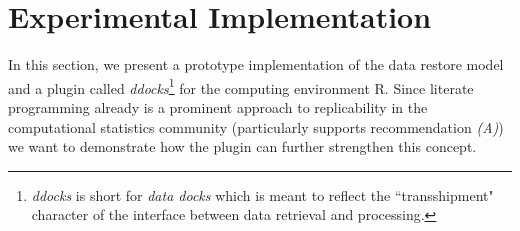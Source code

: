 \documentclass{acm_proc_article-sp}
\begin{document}






















\newpage






\section{Experimental Implementation}\label{sec:impl}

In this section, we present a prototype implementation of the data restore model and a plugin called \textit{ddocks}\footnote{\textit{ddocks} is short for \textit{data docks} which is meant to reflect the ``transshipment" character of the interface between data retrieval and processing.} 
for the computing environment R.
Since literate programming already is a prominent approach to replicability in the computational statistics community \cite{leisch2011executable} (particularly supports recommendation \textit{(A)}) we want to demonstrate how the plugin can further strengthen this concept.
\end{document}
